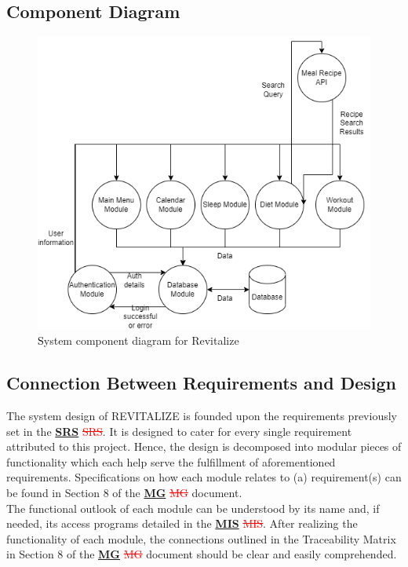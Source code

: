 \documentclass[12pt, titlepage]{article}
\begin{document}
\subsection{Component Diagram}
\begin{figure}[H]
	\centering
	\includegraphics[scale=0.7]{system_diagrams/SystemComponentDiagram.png}
	\caption{\textcolor{black} System component diagram for Revitalize}
\end{figure}
\subsection{Connection Between Requirements and Design} \label{SecConnection}

The system design of REVITALIZE is founded upon the requirements previously set in the \href{https://github.com/BillNguyen1999/REVITALIZE/blob/main/docs/SRS/SRS.pdf}{\textbf{SRS}} {\textcolor{red}{\sout{SRS}}}. It is designed to cater for every single requirement attributed to this project. Hence, the design is decomposed into modular pieces of functionality which each help serve the fulfillment of aforementioned requirements. Specifications on how each module relates to (a) requirement(s) can be found in Section 8 of the \href{https://github.com/BillNguyen1999/REVITALIZE/blob/main/docs/Design/SoftArchitecture/MG.pdf}{\textbf{MG}} {\textcolor{red}{\sout{MG}}} document.\\
The functional outlook of each module can be understood by its name and, if needed, its access programs detailed in the \href{https://github.com/BillNguyen1999/REVITALIZE/blob/main/docs/Design/SoftDetailedDes/MIS.pdf}{\textbf{MIS}} {\textcolor{red}{\sout{MIS}}}. After realizing the functionality of each module, the connections outlined in the Traceability Matrix in Section 8 of the \href{https://github.com/BillNguyen1999/REVITALIZE/blob/main/docs/Design/SoftArchitecture/MG.pdf}{\textbf{MG}} {\textcolor{red}{\sout{MG}}} document should be clear and easily comprehended.
\end{document}
